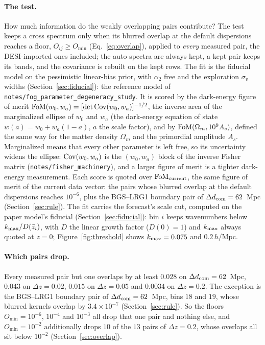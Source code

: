\documentclass[11pt]{article}
\newcommand{\dcom}{$\Delta d_{\rm com} = 62$~Mpc}
\newcommand{\sv}{\sigma_v}
\newcommand{\us}{\_\allowbreak}
\begin{document}
\paragraph{The test.}
How much information do the weakly overlapping pairs contribute?  The
test keeps a cross spectrum only when its blurred overlap at the
default dispersions reaches a floor, $O_{ij} \ge O_{\min}$
(Eq.~\eqref{eq:overlap}), applied to \emph{every} measured pair, the
DESI-imported ones included; the auto spectra are always kept, a kept
pair keeps its bands, and the covariance is rebuilt on the kept rows.
The fit is the fiducial model on the pessimistic linear-bias prior,
with $\alpha_2$ free and the exploration $\sv$ widths
(Section~\ref{sec:fiducial}): the reference model of
\texttt{notes/fog\us parameter\us degeneracy\us study}.  It is scored
by the dark-energy figure of merit
${\rm FoM}(w_0, w_a) = [\det{\rm Cov}(w_0, w_a)]^{-1/2}$, the inverse
area of the marginalized ellipse of $w_0$ and $w_a$ (the dark-energy
equation of state $w(a) = w_0 + w_a(1 - a)$, $a$ the scale factor),
and by ${\rm FoM}(\Omega_m, 10^9 A_s)$, defined the same way for the
matter density $\Omega_m$ and the primordial amplitude $A_s$.
Marginalized means that every other parameter is left free, so its
uncertainty widens the ellipse: ${\rm Cov}(w_0, w_a)$ is the
$(w_0, w_a)$ block of the inverse Fisher matrix
(\texttt{notes/fisher\us machinery}), and a larger figure of merit is
a tighter dark-energy measurement.  Each
score is quoted over ${\rm FoM}_{\rm current}$, the same figure of
merit of the current data vector: the pairs whose blurred overlap at
the default dispersions reaches $10^{-6}$, plus the BGS--LRG1 boundary
pair of \dcom{} (Section~\ref{sec:rule}).  The fit
carries the forecast's scale cut, computed on the paper model's
fiducial (Section~\ref{sec:fiducial}): bin $i$ keeps wavenumbers below
$k_{\rm max}/D(\bar{z}_i)$, with $D$ the linear growth factor
($D(0) = 1$) and $k_{\rm max}$ always quoted at $z = 0$;
Figure~\ref{fig:threshold} shows $k_{\rm max} = 0.075$ and
$0.2\,h$/Mpc.

\paragraph{Which pairs drop.}
Every measured pair but one overlaps by at least $0.028$ on \dcom{},
$0.043$ on $\Delta z = 0.02$, $0.015$ on $\Delta z = 0.05$ and
$0.0034$ on $\Delta z = 0.2$.  The exception is the BGS--LRG1 boundary
pair of \dcom{}, bins $18$ and $19$, whose blurred kernels overlap by
$3.4\times10^{-7}$ (Section~\ref{sec:rule}).  So the floors
$O_{\min} = 10^{-6}$, $10^{-4}$ and $10^{-3}$ all drop that one pair
and nothing else, and $O_{\min} = 10^{-2}$ additionally drops $10$ of
the $13$ pairs of $\Delta z = 0.2$, whose overlaps all sit below
$10^{-2}$ (Section~\ref{sec:overlap}).
\end{document}
